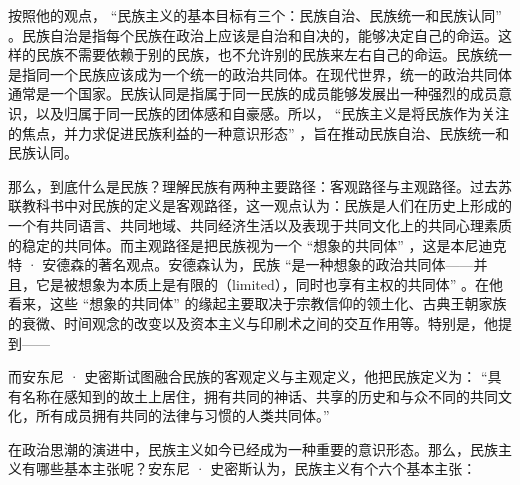 
按照他的观点， “民族主义的基本目标有三个：民族自治、民族统一和民族认同” 。民族自治是指每个民族在政治上应该是自治和自决的，能够决定自己的命运。这样的民族不需要依赖于别的民族，也不允许别的民族来左右自己的命运。民族统一是指同一个民族应该成为一个统一的政治共同体。在现代世界，统一的政治共同体通常是一个国家。民族认同是指属于同一民族的成员能够发展出一种强烈的成员意识，以及归属于同一民族的团体感和自豪感。所以， “民族主义是将民族作为关注的焦点，并力求促进民族利益的一种意识形态” ，旨在推动民族自治、民族统一和民族认同。

那么，到底什么是民族？理解民族有两种主要路径：客观路径与主观路径。过去苏联教科书中对民族的定义是客观路径，这一观点认为：民族是人们在历史上形成的一个有共同语言、共同地域、共同经济生活以及表现于共同文化上的共同心理素质的稳定的共同体。而主观路径是把民族视为一个 “想象的共同体” ，这是本尼迪克特 · 安德森的著名观点。安德森认为，民族 “是一种想象的政治共同体——并且，它是被想象为本质上是有限的（limited），同时也享有主权的共同体” 。在他看来，这些 “想象的共同体” 的缘起主要取决于宗教信仰的领土化、古典王朝家族的衰微、时间观念的改变以及资本主义与印刷术之间的交互作用等。特别是，他提到——


而安东尼 · 史密斯试图融合民族的客观定义与主观定义，他把民族定义为： “具有名称在感知到的故土上居住，拥有共同的神话、共享的历史和与众不同的共同文化，所有成员拥有共同的法律与习惯的人类共同体。” 

在政治思潮的演进中，民族主义如今已经成为一种重要的意识形态。那么，民族主义有哪些基本主张呢？安东尼 · 史密斯认为，民族主义有个六个基本主张：

